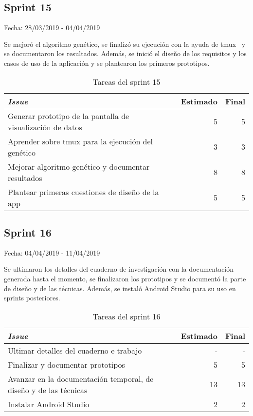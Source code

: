 \subsection{Sprint 15}

Fecha: 28/03/2019 - 04/04/2019

Se mejoró el algoritmo genético, se finalizó su ejecución con la ayuda de tmux~\cite{tmux} y se documentaron los resultados. Además, se inició el diseño de los requisitos y los casos de uso de la aplicación y se plantearon los primeros prototipos. 

\begin{table}[H]
	\begin{tabularx}{\textwidth}{Xrr}
		\toprule \textbf{\textit{Issue}} & \textbf{Estimado} & \textbf{Final}\\
		\toprule 
		Generar prototipo de la pantalla de visualización de datos & 5 & 5 \\
		Aprender sobre tmux para la ejecución del genético & 3 & 3 \\
		Mejorar algoritmo genético y documentar resultados & 8 & 8 \\
		Plantear primeras cuestiones de diseño de la app & 5 & 5 \\
		\bottomrule
	\end{tabularx}
	\caption{Tareas del sprint 15}
\end{table}

\subsection{Sprint 16}

Fecha: 04/04/2019 - 11/04/2019

Se ultimaron los detalles del cuaderno de investigación con la documentación generada hasta el momento, se finalizaron los prototipos y se documentó la parte de diseño y de las técnicas. Además, se instaló Android Studio para su uso en sprints posteriores. 


\begin{table}[H]
	\begin{tabularx}{\textwidth}{Xrr}
		\toprule \textbf{\textit{Issue}} & \textbf{Estimado} & \textbf{Final}\\
		\toprule
		Ultimar detalles del cuaderno e trabajo & - & - \\
		Finalizar y documentar prototipos & 5 & 5 \\
		Avanzar en la documentación temporal, de diseño y de las técnicas & 13 & 13 \\
		Instalar Android Studio & 2 & 2 \\
		\bottomrule
	\end{tabularx}
	\caption{Tareas del sprint 16}
\end{table}

